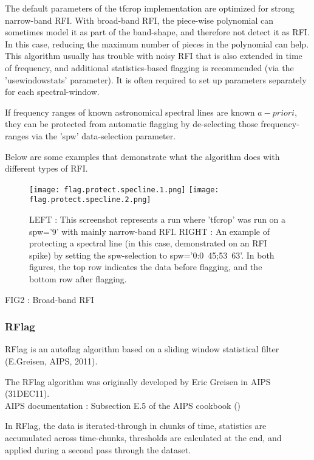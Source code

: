 The default parameters of the tfcrop implementation are optimized for strong narrow-band RFI.
With broad-band RFI, the piece-wise polynomial can sometimes model it as part of the
band-shape, and therefore not detect it as RFI.  In this case, reducing the maximum number 
of pieces in the polynomial can help.     This algorithm usually has trouble with
noisy RFI that is also extended in time of frequency, and additional statistics-based
flagging is recommended (via the 'usewindowstats' parameter).    It is often required to
set up parameters separately for each spectral-window.

If frequency ranges of known astronomical spectral lines are known $a-priori$, they can
be protected from automatic flagging by de-selecting those frequency-ranges via the 
'spw' data-selection parameter. 

Below are some examples that demonstrate what the algorithm does with different types
of RFI.

\begin{figure}
\texttt{[image: flag.protect.specline.1.png]}
\texttt{[image: flag.protect.specline.2.png]}
\caption{LEFT : This screenshot represents a run where 'tfcrop' was run on a spw='9' with mainly narrow-band RFI.  RIGHT : An example of protecting a spectral line (in this case, demonstrated on an RFI spike) by setting the spw-selection to spw='0:0~45;53~63'.   In both figures, the top row indicates the data before flagging, and the bottom row after flagging.}
\end{figure}

{\red
FIG2 : Broad-band RFI
}


\subsubsection{RFlag}

RFlag is an autoflag algorithm based on a sliding window statistical filter (E.Greisen, AIPS, 2011).

The RFlag algorithm was originally developed by Eric Greisen in AIPS (31DEC11). \\
AIPS documentation : Subsection E.5 of the AIPS cookbook ()

In RFlag, the data is iterated-through in chunks
of time, statistics are accumulated across time-chunks, thresholds are calculated
at the end, and applied during a second pass through the dataset. 


